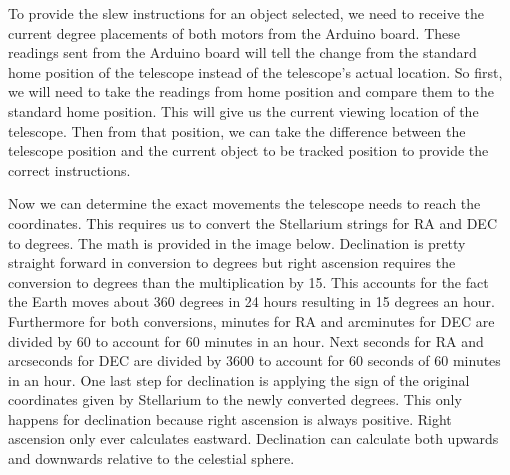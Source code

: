 \documentclass[12pt]{report}
\begin{document}
\begin{enumerate}
To provide the slew instructions for an object selected, we need to receive the current degree placements of both motors from the Arduino board. These readings sent from the Arduino board will tell the change from the standard home position of the telescope instead of the telescope’s actual location. So first, we will need to take the readings from home position and compare them to the standard home position. This will give us the current viewing location of the telescope. Then from that position, we can take the difference between the telescope position and the current object to be tracked position to provide the correct instructions.

Now we can determine the exact movements the telescope needs to reach the coordinates. This requires us to convert the Stellarium strings for RA and DEC to degrees. The math is provided in the image below. Declination is pretty straight forward in conversion to degrees but right ascension requires the conversion to degrees than the multiplication by 15. This accounts for the fact the Earth moves about 360 degrees in 24 hours resulting in 15 degrees an hour. Furthermore for both conversions, minutes for RA and arcminutes for DEC are divided by 60 to account for 60 minutes in an hour. Next seconds  for RA and arcseconds for DEC are divided by 3600 to account for 60 seconds of 60 minutes in an hour. One last step for declination is applying the sign of the original coordinates given by Stellarium to the newly converted degrees. This only happens for declination because right ascension is always positive. Right ascension only ever calculates eastward. Declination can calculate both upwards and downwards relative to the celestial sphere.


\end{enumerate}
\end{document}
